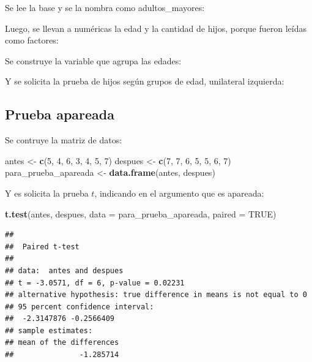 \documentclass[]{book}
\newenvironment{Shaded}{\begin{snugshade}}{\end{snugshade}}
\newcommand{\DataTypeTok}[1]{\textcolor[rgb]{0.13,0.29,0.53}{#1}}
\newcommand{\DecValTok}[1]{\textcolor[rgb]{0.00,0.00,0.81}{#1}}
\newcommand{\KeywordTok}[1]{\textcolor[rgb]{0.13,0.29,0.53}{\textbf{#1}}}
\newcommand{\NormalTok}[1]{#1}
\newcommand{\OtherTok}[1]{\textcolor[rgb]{0.56,0.35,0.01}{#1}}
\newcommand{\StringTok}[1]{\textcolor[rgb]{0.31,0.60,0.02}{#1}}
\begin{document}
Se lee la base y se la nombra como adultos\_mayores:

Luego, se llevan a numéricas la edad y la cantidad de hijos, porque fueron leídas como factores:

Se construye la variable que agrupa las edades:

Y se solicita la prueba de hijos según grupos de edad, unilateral izquierda:

\hypertarget{prueba-apareada}{%
\subsection{Prueba apareada}\label{prueba-apareada}}

Se contruye la matriz de datos:

\begin{Shaded}
\begin{Highlighting}[]
\NormalTok{antes <-}\StringTok{ }\KeywordTok{c}\NormalTok{(}\DecValTok{5}\NormalTok{, }\DecValTok{4}\NormalTok{, }\DecValTok{6}\NormalTok{, }\DecValTok{3}\NormalTok{, }\DecValTok{4}\NormalTok{, }\DecValTok{5}\NormalTok{, }\DecValTok{7}\NormalTok{)}
\NormalTok{despues <-}\StringTok{ }\KeywordTok{c}\NormalTok{(}\DecValTok{7}\NormalTok{, }\DecValTok{7}\NormalTok{, }\DecValTok{6}\NormalTok{, }\DecValTok{5}\NormalTok{, }\DecValTok{5}\NormalTok{, }\DecValTok{6}\NormalTok{, }\DecValTok{7}\NormalTok{)}
\NormalTok{para_prueba_apareada <-}\StringTok{ }\KeywordTok{data.frame}\NormalTok{(antes, despues)}
\end{Highlighting}
\end{Shaded}

Y es solicita la prueba \(t\), indicando en el argumento que es apareada:

\begin{Shaded}
\begin{Highlighting}[]
\KeywordTok{t.test}\NormalTok{(antes, despues, }\DataTypeTok{data =}\NormalTok{ para_prueba_apareada, }\DataTypeTok{paired =} \OtherTok{TRUE}\NormalTok{)}
\end{Highlighting}
\end{Shaded}

\begin{verbatim}
## 
##  Paired t-test
## 
## data:  antes and despues
## t = -3.0571, df = 6, p-value = 0.02231
## alternative hypothesis: true difference in means is not equal to 0
## 95 percent confidence interval:
##  -2.3147876 -0.2566409
## sample estimates:
## mean of the differences 
##               -1.285714
\end{verbatim}
\end{document}

